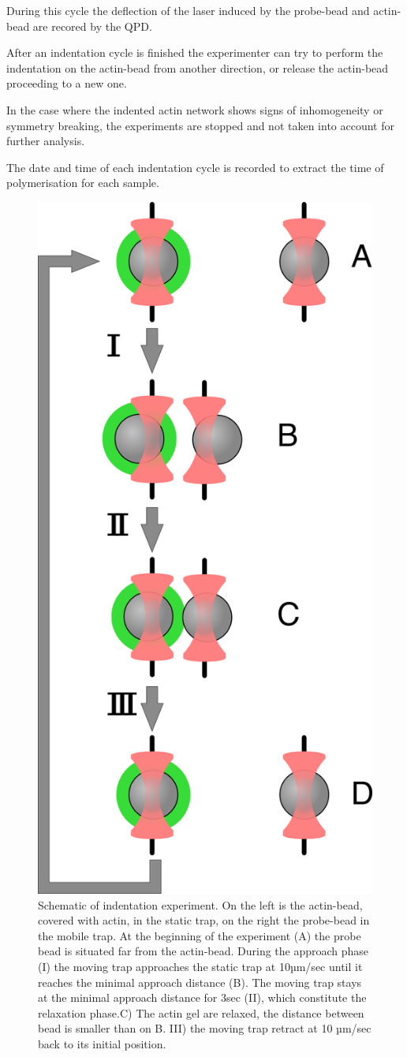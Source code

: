 \documentclass[A4paperpaper,11pt,english]{sphinxmanual}
\begin{document}
During this cycle the deflection of the laser induced by the probe-bead and
actin-bead are recored by the QPD.

After an indentation cycle is finished the experimenter can try to perform the
indentation on the actin-bead from another direction, or release the actin-bead
proceeding to a new one.

In the case where the indented actin network shows signs of inhomogeneity or
symmetry breaking, the experiments are stopped and not taken into account for
further analysis.

The date and time of each indentation cycle is recorded to extract the time of
polymerisation for each sample.
\begin{figure}[htbp]
\centering
\capstart

\includegraphics[width=0.500\linewidth]{beed_move.png}
\caption{Schematic of indentation experiment. On the left is the actin-bead, covered
with actin, in the static trap, on the right the probe-bead in the mobile
trap. At the beginning of the experiment (A) the probe bead is situated far from
the actin-bead. During the approach phase (I) the moving trap approaches
the static trap at 10µm/sec until it reaches the minimal approach
distance (B). The moving trap stays at the minimal approach distance for
3sec (II), which constitute the relaxation phase.C) The actin gel are
relaxed, the distance between bead is smaller than on B. III) the moving
trap retract at 10 µm/sec back to its initial position.}\label{index-latex:bead-move}\end{figure}
\end{document}
